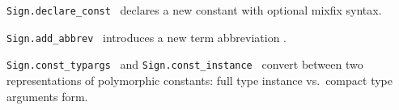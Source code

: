 \begin{isabellebody}
\begin{isamarkuptext}
\begin{description}
  \item \verb|Sign.declare_const|~ declares
  a new constant  with optional mixfix syntax.

  \item \verb|Sign.add_abbrev|~
  introduces a new term abbreviation .

  \item \verb|Sign.const_typargs|~ and \verb|Sign.const_instance|~
  convert between two representations of polymorphic constants: full
  type instance vs.\ compact type arguments form.


\end{description}
\end{isamarkuptext}
\end{isabellebody}
